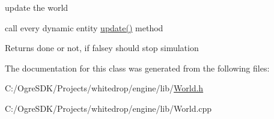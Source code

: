 update the world 

call every dynamic entity \hyperlink{class_whitedrop_1_1_world_aa1ad1877f62b000fa678f993440ff3fc}{update()} method \begin{DoxyReturn}{Returns}
done or not, if falsey should stop simulation 
\end{DoxyReturn}


The documentation for this class was generated from the following files\+:\begin{DoxyCompactItemize}
\item 
C\+:/\+Ogre\+S\+D\+K/\+Projects/whitedrop/engine/lib/\hyperlink{_world_8h}{World.\+h}\item 
C\+:/\+Ogre\+S\+D\+K/\+Projects/whitedrop/engine/lib/World.\+cpp\end{DoxyCompactItemize}
